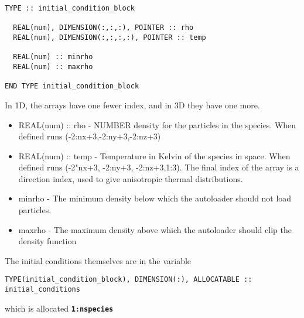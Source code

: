 \documentclass[12pt,a4paper]{article}
\newcommand{\simpleboxverbatim}{\begin{Verbatim}[obeytabs=true,frame=single,
  framerule=0.5mm,rulecolor=\color{warwickmid},formatcom=\color{black}]}
\newcommand{\inlinecode}[1]{{\color{warwickred} \bf\texttt{#1}}}
\begin{document}
\simpleboxverbatim
TYPE :: initial_condition_block

  REAL(num), DIMENSION(:,:,:), POINTER :: rho
  REAL(num), DIMENSION(:,:,:,:), POINTER :: temp

  REAL(num) :: minrho
  REAL(num) :: maxrho

END TYPE initial_condition_block
\end{Verbatim}

In 1D, the arrays have one fewer index, and in 3D they have one more.
\begin{itemize}
\item REAL(num) :: rho - NUMBER density for the particles in the species. When
  defined runs (-2:nx+3,-2:ny+3,-2:nz+3)
\item REAL(num) :: temp - Temperature in Kelvin of the species in space. When
  defined runs (-2"nx+3, -2:ny+3, -2:nz+3,1:3). The final index of the array
  is a direction index, used to give anisotropic thermal distributions.
\item minrho - The minimum density below which the autoloader should not load
  particles.
\item maxrho - The maximum density above which the autoloader should clip the
  density function
\end{itemize}

The initial conditions themselves are in the variable
\simpleboxverbatim
TYPE(initial_condition_block), DIMENSION(:), ALLOCATABLE :: initial_conditions
\end{Verbatim}
which is allocated \inlinecode{1:nspecies}
\end{document}
